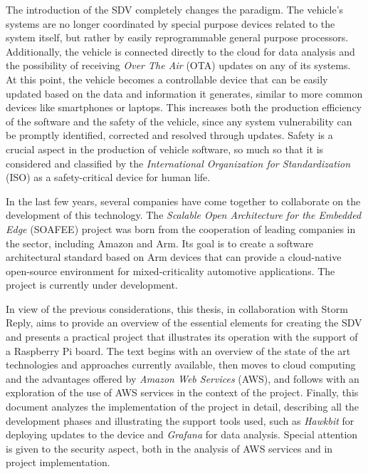 \documentclass[10pt,a4paper,roman, twocolumn]{article}
\begin{document}
The introduction of the SDV completely changes the paradigm. The vehicle's systems are no longer coordinated by special purpose devices related to the system itself, but rather by easily reprogrammable general purpose processors. Additionally, the vehicle is connected directly to the cloud for data analysis and the possibility of receiving \textit{Over The Air} (OTA) updates on any of its systems. At this point, the vehicle becomes a controllable device that can be easily updated based on the data and information it generates, similar to more common devices like smartphones or laptops. This increases both the production efficiency of the software and the safety of the vehicle, since any system vulnerability can be promptly identified, corrected and resolved through updates. Safety is a crucial aspect in the production of vehicle software, so much so that it is considered and classified by the \textit{International Organization for Standardization} (ISO) as a safety-critical device for human life.

In the last few years, several companies have come together to collaborate on the development of this technology. The \textit{Scalable Open Architecture for the Embedded Edge} (SOAFEE) project was born from the cooperation of leading companies in the sector, including Amazon and Arm. Its goal is to create a software architectural standard based on Arm devices that can provide a cloud-native open-source environment for mixed-criticality automotive applications. The project is currently under development.

In view of the previous considerations, this thesis, in collaboration with Storm Reply, aims to provide an overview of the essential elements for creating the SDV and presents a practical project that illustrates its operation with the support of a Raspberry Pi board. The text begins with an overview of the state of the art technologies and approaches currently available, then moves to cloud computing and the advantages offered by \textit{Amazon Web Services} (AWS), and follows with an exploration of the use of AWS services in the context of the project. Finally, this document analyzes the implementation of the project in detail, describing all the development phases and illustrating the support tools used, such as \textit{Hawkbit} for deploying updates to the device and \textit{Grafana} for data analysis. Special attention is given to the security aspect, both in the analysis of AWS services and in project implementation.
\end{document}

